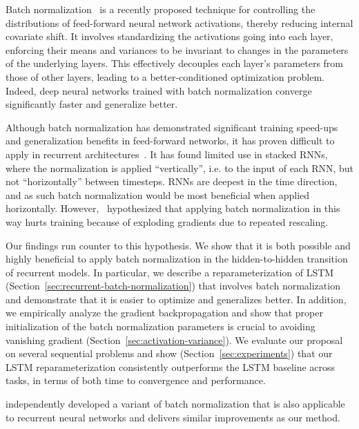\documentclass{article} %
\begin{document}
Batch normalization~\citep{batchnorm} is a recently proposed technique for controlling the distributions of feed-forward neural network activations, thereby reducing internal covariate shift.
It involves standardizing the activations going into each layer, enforcing their means and variances to be invariant to changes in the parameters of the underlying layers.
This effectively decouples each layer's parameters from those of other layers, leading to a better-conditioned optimization problem.
Indeed, deep neural networks trained with batch normalization converge significantly faster and generalize better.

Although batch normalization has demonstrated significant training speed-ups and generalization benefits in feed-forward networks,
it has proven difficult to apply in recurrent architectures~\citep{cesar,baidu}.
It has found limited use in stacked RNNs, where the normalization is applied ``vertically'',
i.e. to the input of each RNN, but not ``horizontally'' between timesteps.
RNNs are deepest in the time direction, and as such batch normalization would be most beneficial when applied horizontally.
However,~\citet{cesar} hypothesized that applying batch normalization in this way hurts training
because of exploding gradients due to repeated rescaling.

Our findings run counter to this hypothesis.
We show that it is both possible and highly beneficial to apply batch normalization in the hidden-to-hidden transition of recurrent models.
In particular, we describe a reparameterization of LSTM (Section~\ref{sec:recurrent-batch-normalization}) that involves batch normalization
and demonstrate that it is easier to optimize and generalizes better.
In addition, we empirically analyze the gradient backpropagation and show that proper initialization
of the batch normalization parameters is crucial to avoiding vanishing gradient (Section~\ref{sec:activation-variance}).
We evaluate our proposal on several sequential problems and show (Section~\ref{sec:experiments}) that our
LSTM reparameterization consistently outperforms the LSTM baseline across tasks,
in terms of both time to convergence and performance.

\citep{ba2016layer} independently developed a variant of batch normalization that is
also applicable to recurrent neural networks and delivers similar improvements as our method.
\end{document}
